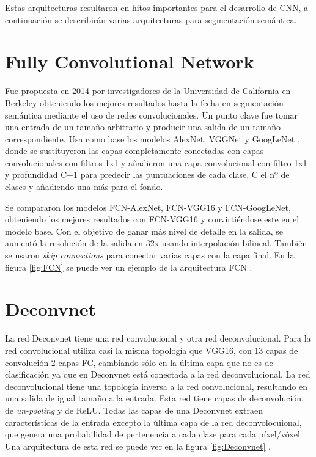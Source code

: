 Estas arquitecturas resultaron en hitos importantes para el desarrollo de CNN, a continuación se describirán varias arquitecturas para segmentación semántica.

\section{Fully Convolutional Network}

Fue propuesta en 2014 por investigadores de la Universidad de California en Berkeley \cite{Long2014} obteniendo los mejores resultados hasta la fecha en segmentación semántica mediante el uso de redes convolucionales. Un punto clave fue tomar una entrada de un tamaño arbitrario y producir una salida de un tamaño correspondiente. Usa como base los modelos AlexNet, VGGNet y GoogLeNet \cite{Szegedy2014}, donde se sustituyeron las capas completamente conectadas con capas convolucionales con filtros 1x1 y añadieron una capa convolucional con filtro 1x1 y profundidad C+1 para predecir las puntuaciones de cada clase, C el nº de clases y añadiendo una más para el fondo.

Se compararon los modelos FCN-AlexNet, FCN-VGG16 y FCN-GoogLeNet, obteniendo los mejores resultados con FCN-VGG16 y convirtiéndose este en el modelo base. Con el objetivo de ganar más nivel de detalle en la salida, se aumentó la resolución de la salida en 32x usando interpolación bilineal. También se usaron \textit{skip connections} para conectar varias capas con la capa final. En la figura \ref{fig:FCN} se puede ver un ejemplo de la arquitectura FCN \cite{Sultana2020}.



\section{Deconvnet}

La red Deconvnet \cite{Noh2015} tiene una red convolucional y otra red deconvolucional. Para la red convolucional utiliza casi la misma topología que VGG16, con 13 capas de convolución 2 capas FC, cambiando sólo en la última capa que no es de clasificación ya que en Deconvnet está conectada a la red deconvolucional. La red deconvolucional tiene una topología inversa a la red convolucional, resultando en una salida de igual tamaño a la entrada. Esta red tiene capas de deconvolución, de \textit{un-pooling} y de ReLU. Todas las capas de una Deconvnet extraen características de la entrada excepto la última capa de la red deconvolocuional, que genera una probabilidad de pertenencia a cada clase para cada píxel/vóxel. Una arquitectura de esta red se puede ver en la figura \ref{fig:Deconvnet} \cite{Noh2015}.

